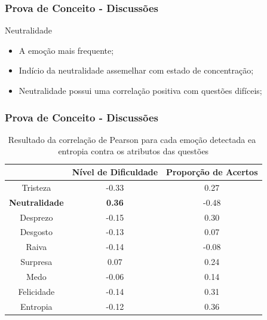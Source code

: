 \documentclass{beamer}
\begin{document}
\begin{frame}
\frametitle{Prova de Conceito - Discussões}
\begin{block}{Neutralidade}
\begin{itemize}
\pause
\item A emo\c{c}\~ao mais frequente;
\pause
\item Ind\'{i}cio da neutralidade assemelhar com estado de concentra\c{c}\~ao;
\pause
\item Neutralidade possui uma correla\c{c}\~ao positiva com quest\~oes dif\'{i}ceis;

\end{itemize}
\end{block}

\end{frame}

\begin{frame}
\frametitle{Prova de Conceito - Discussões}
\begin{table}[]\footnotesize
\centering
\caption{Resultado​ ​da​ ​correla\c{c}\~ao​ ​de​ ​Pearson​ ​para​ ​cada​ ​emo\c{c}\~ao​ ​detectada
e​ ​a​ ​entropia​ ​contra​ ​os​ ​atributos​ ​das​ ​quest\~oes}
\label{my-label}
\begin{tabular}{|c|c|c|}
\hline
                      & \textbf{Nível de Dificuldade} & \textbf{Proporção de Acertos} \\ \hline
Tristeza	     & -0.33                & 0.27                          \\ \hline
\small \textbf{Neutralidade} & \small \textbf{0.36}                 & -0.48                \\ \hline
Desprezo     		& -0.15                         & 0.30                 \\ \hline
Desgosto              & -0.13                         & 0.07                          \\ \hline
Raiva                 & -0.14                         & -0.08                         \\ \hline
Surpresa              & 0.07                          & 0.24                          \\ \hline
Medo                  & -0.06                         & 0.14                          \\ \hline
Felicidade   		& -0.14                         & 0.31                 \\ \hline
Entropia     		& -0.12                         & 0.36                 \\ \hline
\end{tabular}
\end{table}
\end{frame}
\end{document}
